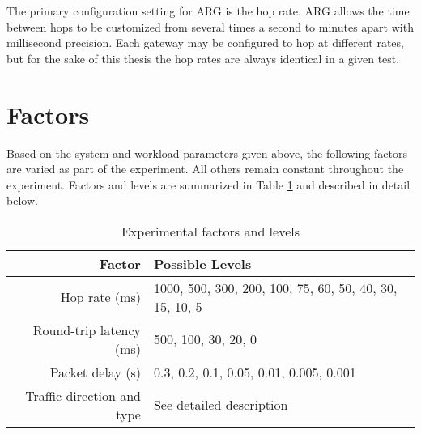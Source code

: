 \par The primary configuration setting for \ac{ARG} is the hop rate. \ac{ARG} allows the time between hops to be customized from several times a second to minutes apart with millisecond precision. Each gateway may be configured to hop at different rates, but for the sake of this thesis the hop rates are always identical in a given test.

\section{Factors}
\FloatBarrier
\label{sec:factors}
\par Based on the system and workload parameters given above, the following factors are varied as part of the experiment. All others remain constant throughout the experiment. Factors and levels are summarized in Table \ref{tbl:factors} and described in detail below.

\begin{table}
\begin{center}
	\caption{Experimental factors and levels}
	\label{tbl:factors}
	
	\begin{tabular}{r|l}
	\textbf{Factor} & \textbf{Possible Levels} \\
	\hline
	Hop rate (ms) & 1000, 500, 300, 200, 100, 75, 60, 50, 40, 30, 15, 10, 5\\
	Round-trip latency (ms) & 500, 100, 30, 20, 0\\
	Packet delay (s) & 0.3, 0.2, 0.1, 0.05, 0.01, 0.005, 0.001\\
	Traffic direction and type & See detailed description
	\end{tabular}
\end{center}
\end{table}

